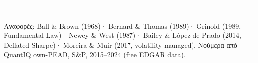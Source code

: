 \documentclass[11pt]{article}
\begin{document}
\vfill
\noindent\rule{\linewidth}{0.4pt}\\[2pt]
\footnotesize Αναφορές: Ball \& Brown (1968)· Bernard \& Thomas (1989)· Grinold (1989, Fundamental Law)·
Newey \& West (1987)· Bailey \& López de Prado (2014, Deflated Sharpe)· Moreira \& Muir (2017,
volatility-managed). Νούμερα από QuantIQ own-PEAD, S\&P, 2015--2024 (free EDGAR data).
\end{document}
